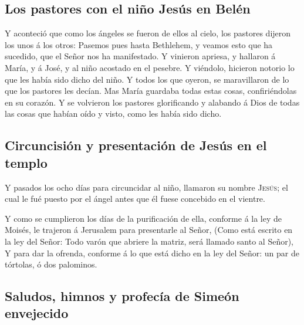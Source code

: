 \hypertarget{los-pastores-con-el-niuxf1o-jesuxfas-en-beluxe9n}{%
\subsection{Los pastores con el niño Jesús en
Belén}\label{los-pastores-con-el-niuxf1o-jesuxfas-en-beluxe9n}}

 Y aconteció que como los ángeles se fueron de ellos al
cielo, los pastores dijeron los unos á los otros: Pasemos pues hasta
Bethlehem, y veamos esto que ha sucedido, que el Señor nos ha
manifestado.  Y vinieron apriesa, y hallaron á María, y á
José, y al niño acostado en el pesebre.  Y viéndolo,
hicieron notorio lo que les había sido dicho del niño.  Y
todos los que oyeron, se maravillaron de lo que los pastores les decían.
 Mas María guardaba todas estas cosas, confiriéndolas en
su corazón.  Y se volvieron los pastores glorificando y
alabando á Dios de todas las cosas que habían oído y visto, como les
había sido dicho.

\hypertarget{circuncisiuxf3n-y-presentaciuxf3n-de-jesuxfas-en-el-templo}{%
\subsection{Circuncisión y presentación de Jesús en el
templo}\label{circuncisiuxf3n-y-presentaciuxf3n-de-jesuxfas-en-el-templo}}

 Y pasados los ocho días para circuncidar al niño,
llamaron su nombre \textsc{Jesús}; el cual le fué puesto por el ángel
antes que él fuese concebido en el vientre.

 Y como se cumplieron los días de la purificación de
ella, conforme á la ley de Moisés, le trajeron á Jerusalem para
presentarle al Señor,  (Como está escrito en la ley del
Señor: Todo varón que abriere la matriz, será llamado santo al Señor),
 Y para dar la ofrenda, conforme á lo que está dicho en
la ley del Señor: un par de tórtolas, ó dos palominos.

\hypertarget{saludos-himnos-y-profecuxeda-de-simeuxf3n-envejecido}{%
\subsection{Saludos, himnos y profecía de Simeón
envejecido}\label{saludos-himnos-y-profecuxeda-de-simeuxf3n-envejecido}}

